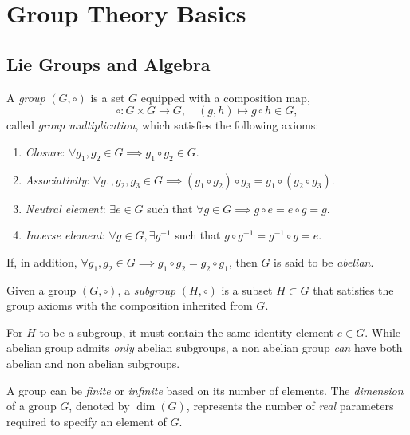 \section{Group Theory Basics}

\subsection{Lie Groups and Algebra}\label{sec:lie-groups-algebras}
\begin{definition}[Group]\label{def:group-axioms}
    A \emph{group} $(G,\circ)$ is a set $G$ equipped with a composition map,
    \begin{equation}
        \circ \colon G \times G \to G, \quad (g,h) \mapsto g \circ h \in G ,
    \end{equation}
    called \emph{group multiplication}, which satisfies the following axioms:
    \begin{enumerate}
        \item \emph{Closure}: $\forall g_1, g_2 \in G \implies g_1 \circ g_2 \in G$.
        \item \emph{Associativity}: $\forall g_1, g_2, g_3 \in G \implies (g_1 \circ g_2) \circ g_3 = g_1 \circ (g_2 \circ g_3)$.
        \item \emph{Neutral element}: $\exists e \in G$ such that $\forall g \in G \implies g \circ e = e \circ g = g$.
        \item \emph{Inverse element}: $\forall g \in G, \exists g^{-1}$ such that $g \circ g^{-1} = g^{-1} \circ g = e$.
    \end{enumerate}
    If, in addition, $\forall g_1, g_2 \in G \implies g_1 \circ g_2 = g_2 \circ g_1$, then $G$ is said to be \emph{abelian}.
\end{definition}

\begin{definition}[Subgroup]
    Given a group $(G, \circ)$, a \emph{subgroup} $(H,\circ)$ is a subset $H \subset G$ that satisfies the group axioms with the composition inherited from $G$.
\end{definition}

\begin{remark}
    For $H$ to be a subgroup, it must contain the same identity element $e \in G$. While abelian group admits \emph{only} abelian subgroups, a non abelian group \emph{can} have both abelian and non abelian subgroups.
\end{remark}

A group can be \emph{finite} or \emph{infinite} based on its number of elements. The \emph{dimension} of a group $G$, denoted by $\dim(G)$, represents the number of \emph{real} parameters required to specify an element of $G$.

